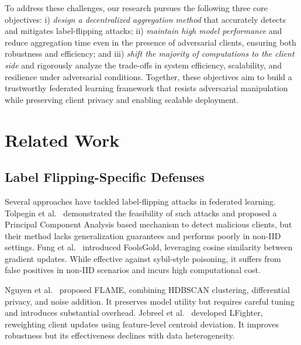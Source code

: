 \documentclass[conference]{IEEEtran}
\begin{document}
To address these challenges, our research pursues the following three core objectives: i) \textit{design a decentralized aggregation method} that accurately detects and mitigates label-flipping attacks; ii) \textit{maintain high model performance} and reduce aggregation time even in the presence of adversarial clients, ensuring both robustness and efficiency; and iii) \textit{shift the majority of computations to the client side} and rigorously analyze the trade-offs in system efficiency, scalability, and resilience under adversarial conditions. Together, these objectives aim to build a trustworthy federated learning framework that resists adversarial manipulation while preserving client privacy and enabling scalable deployment.


\section{Related Work}
\label{sec:relatedworks}

\subsection{Label Flipping-Specific Defenses}
Several approaches have tackled label-flipping attacks in federated learning. Tolpegin et al.~\cite{tolpegin2020data} demonstrated the feasibility of such attacks and proposed a Principal Component Analysis based mechanism to detect malicious clients, but their method lacks generalization guarantees and performs poorly in non-IID settings. Fung et al.~\cite{fung2020limitations} introduced FoolsGold, leveraging cosine similarity between gradient updates. While effective against sybil-style poisoning, it suffers from false positives in non-IID scenarios and incurs high computational cost. 

Nguyen et al.~\cite{nguyen2022flame} proposed FLAME, combining HDBSCAN clustering, differential privacy, and noise addition. It preserves model utility but requires careful tuning and introduces substantial overhead. Jebreel et al.~\cite{jebreel2024lfighter} developed LFighter, reweighting client updates using feature-level centroid deviation. It improves robustness but its effectiveness declines with data heterogeneity.
\end{document}
